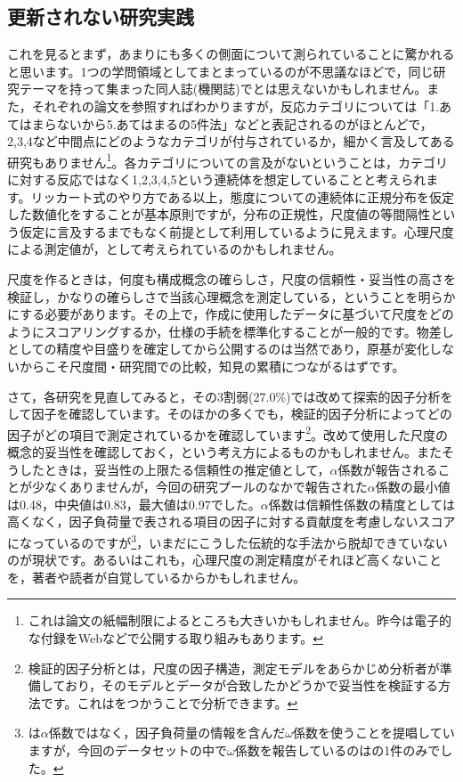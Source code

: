 \documentclass{ltjsbook}
\begin{document}
\subsection{更新されない研究実践}
これを見るとまず，あまりにも多くの側面について測られていることに驚かれると思います。1つの学問領域としてまとまっているのが不思議なほどで，同じ研究テーマを持って集まった同人誌(機関誌)でとは思えないかもしれません。また，それぞれの論文を参照すればわかりますが，反応カテゴリについては「1.あてはまらないから5.あてはまるの5件法」などと表記されるのがほとんどで，2,3,4など中間点にどのようなカテゴリが付与されているか，細かく言及してある研究もありません\footnote{これは論文の紙幅制限によるところも大きいかもしれません。昨今は電子的な付録をWebなどで公開する取り組みもあります。}。各カテゴリについての言及がないということは，カテゴリに対する反応ではなく1,2,3,4,5という連続体を想定していることと考えられます。リッカート式のやり方である以上，態度についての連続体に正規分布を仮定した数値化をすることが基本原則ですが，分布の正規性，尺度値の等間隔性という仮定に言及するまでもなく前提として利用しているように見えます。心理尺度による測定値が，として考えられているのかもしれません。

尺度を作るときは，何度も構成概念の確らしさ，尺度の信頼性・妥当性の高さを検証し，かなりの確らしさで当該心理概念を測定している，ということを明らかにする必要があります。その上で，作成に使用したデータに基づいて尺度をどのようにスコアリングするか，仕様の手続を標準化することが一般的です。物差しとしての精度や目盛りを確定してから公開するのは当然であり，原基が変化しないからこそ尺度間・研究間での比較，知見の累積につながるはずです。

さて，各研究を見直してみると，その3割弱(27.0\%)では改めて探索的因子分析をして因子を確認しています。そのほかの多くでも，検証的因子分析によってどの因子がどの項目で測定されているかを確認しています\footnote{検証的因子分析とは，尺度の因子構造，測定モデルをあらかじめ分析者が準備しており，そのモデルとデータが合致したかどうかで妥当性を検証する方法です。これはをつかうことで分析できます。}。改めて使用した尺度の概念的妥当性を確認しておく，という考え方によるものかもしれません。またそうしたときは，妥当性の上限たる信頼性の推定値として，$\alpha$係数が報告されることが少なくありませんが，今回の研究プールのなかで報告された$\alpha$係数の最小値は0.48，中央値は0.83，最大値は0.97でした。$\alpha$係数は信頼性係数の精度としては高くなく，因子負荷量で表される項目の因子に対する貢献度を考慮しないスコアになっているのですが\footnote{\textcite{ShimizuKazuaki2007}は$\alpha$係数ではなく，因子負荷量の情報を含んだ$\omega$係数を使うことを提唱していますが，今回のデータセットの中で$\omega$係数を報告しているのは\textcite{Nagai202192}の1件のみでした。}，いまだにこうした伝統的な手法から脱却できていないのが現状です。あるいはこれも，心理尺度の測定精度がそれほど高くないことを，著者や読者が自覚しているからかもしれません。
\end{document}
